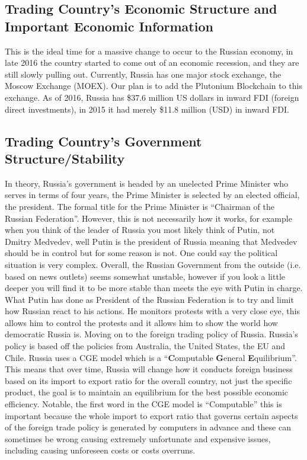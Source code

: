 \documentclass[12pt]{article}
\begin{document}
\subsection{Trading Country's Economic Structure and Important Economic Information}
This is the ideal time for a massive change to occur to the Russian economy, in late 2016
the country started to come out of an economic recession, and they are still slowly pulling
out. Currently, Russia has one major stock exchange, the Moscow Exchange (MOEX). Our plan is to add the Plutonium Blockchain to this exchange. As of 2016, Russia has \$37.6 million US dollars in inward FDI (foreign direct investments), in 2015 it had merely \$11.8 million (USD) in inward FDI. 
\subsection{Trading Country's Government Structure/Stability}
In theory, Russia's government is headed by an unelected Prime Minister who serves in terms of four years, the Prime Minister is selected by an elected official, the president. The formal title for the Prime Minister is ``Chairman of the Russian Federation''. However, this is not necessarily how it works, for example when you think of the leader of Russia you most likely think of Putin, not Dmitry Medvedev, well Putin is the president of Russia meaning that Medvedev should be in control but for some reason is not. One could say the political situation is very complex. Overall, the Russian Government from the outside (i.e. based on news outlets) seems somewhat unstable, however if you look a little deeper you will find it to be more stable than meets the eye with Putin in charge. What Putin has done as President of the Russian Federation is to try and limit how Russian react to his actions. He monitors protests with a very close eye, this allows him to control the protests and it allows him to show the world how democratic Russia is. Moving on to the foreign trading policy of Russia. Russia’s policy is based off the policies from Australia, the United States, the EU and Chile. Russia uses a CGE model which is a ``\textbf{C}omputable \textbf{G}eneral \textbf{E}quilibrium''. This means that over time, Russia will change how it conducts foreign business based on its import to export ratio for the overall country, not just the specific product, the goal is to maintain an equilibrium for the best possible economic efficiency. Notable, the first word in the CGE model is ``Computable'' this is important because the whole import to export ratio that governs certain aspects of the foreign trade policy is
generated by computers in advance and these can sometimes be wrong causing extremely
unfortunate and expensive issues, including causing unforeseen costs or costs overruns.
\end{document}
